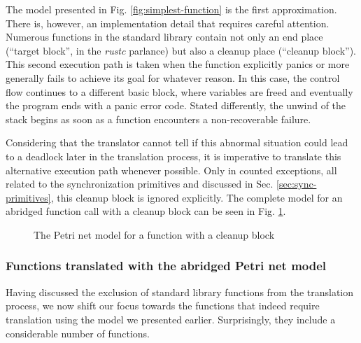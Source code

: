 The model presented in Fig. \ref{fig:simplest-function} is the first approximation.
There is, however, an implementation detail that requires careful attention.
Numerous functions in the standard library contain not only an end place
(``target block'', in the \emph{rustc} parlance) but also a cleanup place (``cleanup block'').
This second execution path is taken when the function explicitly panics
or more generally fails to achieve its goal for whatever reason.
In this case, the control flow continues to a different basic block,
where variables are freed and eventually the program ends with a panic error code.
Stated differently, the unwind of the stack begins
as soon as a function encounters a non-recoverable failure.

Considering that the translator cannot tell if this abnormal situation could lead
to a deadlock later in the translation process, it is imperative to translate
this alternative execution path whenever possible.
Only in counted exceptions, all related to the synchronization primitives and discussed in Sec.
\ref{sec:sync-primitives}, this cleanup block is ignored explicitly.
The complete model for an abridged function call with a cleanup block
can be seen in Fig. \ref{fig:function-with-cleanup}.

\begin{figure}[!htb]
    \centering
    
    \caption{The Petri net model for a function with a cleanup block}
    \label{fig:function-with-cleanup}
\end{figure}

\subsubsection{Functions translated with the abridged Petri net model}

Having discussed the exclusion of standard library functions from the translation process,
we now shift our focus towards the functions that indeed require translation using the model we presented earlier.
Surprisingly, they include a considerable number of functions.

